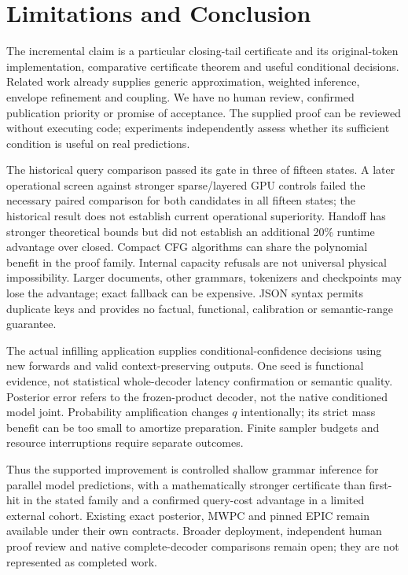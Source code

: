 \documentclass[12pt]{article}
\theoremstyle{readable}
\begin{document}
\section{Limitations and Conclusion}

The incremental claim is a particular closing-tail certificate and its
original-token implementation, comparative certificate theorem and useful
conditional decisions. Related work already supplies generic approximation,
weighted inference, envelope refinement and coupling. We have no human review,
confirmed publication priority or promise of acceptance. The supplied proof
can be reviewed without executing code; experiments independently assess
whether its sufficient condition is useful on real predictions.

The historical query comparison passed its gate in three of fifteen states.
A later operational screen against stronger sparse/layered GPU controls failed
the necessary paired comparison for both candidates in all fifteen states;
the historical result does not establish current operational superiority.
Handoff has stronger theoretical bounds but did not establish an additional
20\% runtime advantage over closed. Compact CFG algorithms can share the
polynomial benefit in the proof family. Internal capacity refusals are not
universal physical impossibility. Larger documents, other grammars,
tokenizers and checkpoints may lose the advantage; exact fallback can be
expensive. JSON syntax permits duplicate keys and provides no factual,
functional, calibration or semantic-range guarantee.

The actual infilling application supplies conditional-confidence decisions
using new forwards and valid context-preserving outputs. One seed is functional
evidence, not statistical whole-decoder latency confirmation or semantic
quality. Posterior error refers to the frozen-product decoder, not the native
conditioned model joint. Probability amplification changes $q$ intentionally;
its strict mass benefit can be too small to amortize preparation. Finite sampler
budgets and resource interruptions require separate outcomes.

Thus the supported improvement is controlled shallow grammar inference for
parallel model predictions, with a mathematically stronger certificate than
first-hit in the stated family and a confirmed query-cost advantage in a
limited external cohort. Existing exact posterior, MWPC and pinned EPIC remain
available under their own contracts. Broader deployment, independent human
proof review and native complete-decoder comparisons remain open; they are
not represented as completed work.
\end{document}

